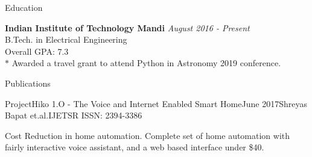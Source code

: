 \documentclass{resume} %
\begin{document}

\begin{rSection}{Education}

{\bf Indian Institute of Technology Mandi} \hfill {\em August 2016  - Present} \\ 
B.Tech. in Electrical Engineering \\
Overall GPA:  7.3 \\
$*$  Awarded a travel grant to attend Python in Astronomy 2019 conference. 

\end{rSection}

\begin{rSection}{Publications}


\begin{rSubsection}{ProjectHiko 1.O - The Voice and Internet Enabled Smart Home}{June 2017}{Shreyas Bapat et.al.}{IJETSR ISSN: 2394-3386}
\item Cost Reduction in home automation. Complete set of home automation with fairly interactive voice assistant, and a web based interface under \$40. 
 \end{rSubsection}
\end{rSection}

\end{document}
